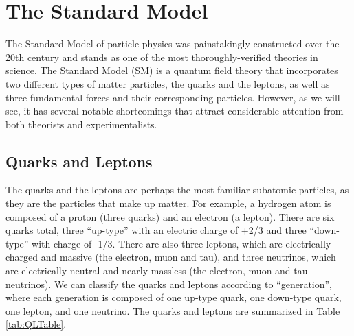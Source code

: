 \documentclass[11pt]{article}
\title{}
\author{}
\date{} %
\begin{document}
\maketitle
\tableofcontents

\section{The Standard Model}
The Standard Model of particle physics was painstakingly constructed over the 20th century and stands as one of the most thoroughly-verified theories in science.  The Standard Model (SM) is a quantum field theory that incorporates two different types of matter particles, the quarks and the leptons, as well as three fundamental forces and their corresponding particles.  However, as we will see, it has several notable shortcomings that attract considerable attention from both theorists and experimentalists.  

\subsection{Quarks and Leptons}
The quarks and the leptons are perhaps the most familiar subatomic particles, as they are the particles that make up matter.  For example, a hydrogen atom is composed of a proton (three quarks) and an electron (a lepton).  There are six quarks total, three ``up-type'' with an electric charge of +2/3 and three ``down-type'' with charge of -1/3.  There are also three leptons, which are electrically charged and massive (the electron, muon and tau), and three neutrinos, which are electrically neutral and nearly massless (the electron, muon and tau neutrinos).  We can classify the quarks and leptons according to ``generation'', where each generation is composed of one up-type quark, one down-type quark, one lepton, and one neutrino.  The quarks and leptons are summarized in Table \ref{tab:QLTable}.
\end{document}
